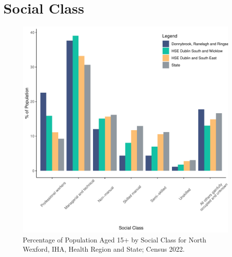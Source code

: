 \documentclass{article}
\begin{document}
\section{Social Class}\label{sect:SC}
\begin{figure}[H]
	\centering
	\includegraphics[width = 140mm]{../figures/SocialClassED.pdf}
	\caption{Percentage of Population Aged 15+ by Social Class for North Wexford, IHA, Health Region and State; Census 2022.}
	\label{fig:vbnv}
	\end{figure}
\end{document}
